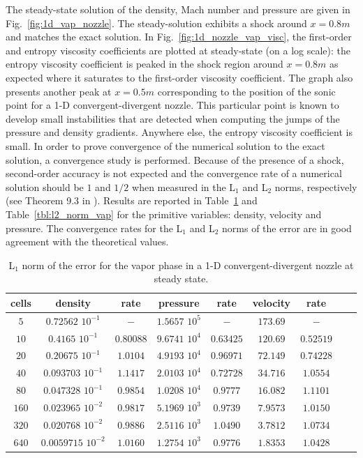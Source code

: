 \documentclass[preprint,10pt]{elsarticle}
\newcommand{\fig}[1]{Fig.~\ref{#1}}                      %
\newcommand{\tbl}[1]{Table~\ref{#1}}                     %
\begin{document}
%
The steady-state solution of the density, Mach number and pressure are given in \fig{fig:1d_vap_nozzle}. The steady-solution exhibits a shock around $x=0.8m$ and matches the exact solution. In \fig{fig:1d_nozzle_vap_visc}, the first-order and entropy viscosity coefficients are plotted at steady-state (on a log scale): the entropy viscosity coefficient is peaked in the shock region around $x=0.8m$ as expected where it saturates to the first-order viscosity coefficient. The graph also presents another peak at $x=0.5m$  corresponding to the position of the sonic point for a 1-D convergent-divergent nozzle. This particular point is known to develop small instabilities that are detected when computing the jumps of the pressure and density gradients. Anywhere else, the entropy  viscosity coefficient is small. In order to prove convergence of the numerical solution to the exact solution, a convergence study is performed. Because of the presence of a shock, second-order accuracy is not expected and the convergence rate of a numerical solution should be $1$ and $1/2$ when measured in the L$_1$ and L$_2$ norms, respectively (see Theorem 9.3 in \cite{convergence_book}). Results are reported in \tbl{tbl:l1_norm_vap} and \tbl{tbl:l2_norm_vap} for the primitive variables: density, velocity and pressure. The convergence rates for the L$_1$ and L$_2$ norms of the error are in good agreement with the theoretical values.
%
\begin{table}[!htbp]
\begin{center}
 \caption{\label{tbl:l1_norm_vap} L$_1$ norm of the error for the vapor phase in a 1-D convergent-divergent nozzle at steady state.}
 \begin{tabular}{|c|c|c|c|c|c|c|c|c|}
 \hline
cells & density              & rate      & pressure          & rate      & velocity & rate      \\ \hline
$5$  & $0.72562$   $10^{-1}$ & $-$       & $1.5657$ $10^{5}$ & $-$       & $173.69$ & $-$       \\ \hline
$10$ & $0.4165$    $10^{-1}$ & $0.80088$ & $9.6741$ $10^{4}$ & $0.63425$ & $120.69$ & $0.52519$ \\ \hline
$20$ & $0.20675$   $10^{-1}$ & $1.0104$  & $4.9193$ $10^{4}$ & $0.96971$ & $72.149$ & $0.74228$ \\ \hline
$40$ & $0.093703$  $10^{-1}$ & $1.1417$  & $2.0103$ $10^{4}$ & $0.72728$ & $34.716$ & $1.0554$  \\ \hline
$80$ & $0.047328$  $10^{-1}$ & $0.9854$  & $1.0208$ $10^{4}$ & $0.9777$  & $16.082$ & $1.1101$  \\ \hline
$160$& $0.023965$  $10^{-2}$ & $0.9817$  & $5.1969$ $10^{3}$ & $0.9739$  & $7.9573$ & $1.0150$  \\ \hline
$320$& $0.020768$  $10^{-2}$ & $0.9886$  & $2.5116$ $10^{3}$ & $1.0490$  & $3.7812$ & $1.0734$  \\ \hline
$640$& $0.0059715$ $10^{-2}$ & $1.0160$  & $1.2754$ $10^{3}$ & $0.9776$  & $1.8353$ & $1.0428$  \\ \hline
\end{tabular}
\end{center}
\nonumber
\end{table}
\end{document}
